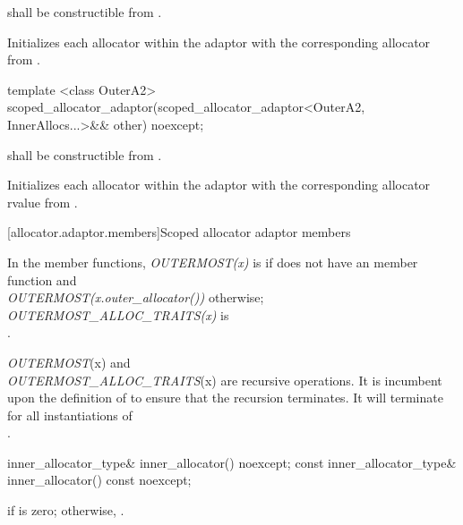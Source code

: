 \begin{itemdescr}
\pnum
\requires {} shall be constructible from .

\pnum
\effects Initializes each allocator within the adaptor with the corresponding allocator
from .
\end{itemdescr}

%
\begin{itemdecl}
template <class OuterA2>
  scoped_allocator_adaptor(scoped_allocator_adaptor<OuterA2,
                                                    InnerAllocs...>&& other) noexcept;
\end{itemdecl}

\begin{itemdescr}
\pnum
\requires {} shall be constructible from .

\pnum
\effects Initializes each allocator within the adaptor with the corresponding allocator rvalue
from .
\end{itemdescr}

[allocator.adaptor.members]{Scoped allocator adaptor members}

\pnum
In the  member functions,
\textit{OUTERMOST(x)} is  if  does not have an
 member function and \\
\textit{OUTERMOST(x.outer_allocator())}
otherwise;
\textit{OUTERMOST_ALLOC_TRAITS(x)} is \\
.
\begin{note} \textit{OUTERMOST}(x) and \\
\textit{OUTERMOST_ALLOC_TRAITS}(x) are recursive operations. It
is incumbent upon the definition of  to ensure that the
recursion terminates. It will terminate for all instantiations of \\
. \end{note}

%
\begin{itemdecl}
inner_allocator_type& inner_allocator() noexcept;
const inner_allocator_type& inner_allocator() const noexcept;
\end{itemdecl}

\begin{itemdescr}
\pnum
\returns {} if  is zero; otherwise,
.
\end{itemdescr}

